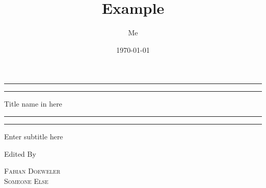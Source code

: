 \documentclass[12pt]{article}
\title{Example}
\author{Me}
\date{\today}
\begin{document}
 

\begin{titlepage} %

	\centering %
	
	\scshape %
	
	\vspace*{\baselineskip} %
	
	
	\rule{\textwidth}{1.6pt}\vspace*{-\baselineskip}\vspace*{2pt} %
	\rule{\textwidth}{0.4pt} %
	
	\vspace{0.75\baselineskip} %
	
	{\LARGE Title name in here} %
	
	\vspace{0.75\baselineskip} %
	
	\rule{\textwidth}{0.4pt}\vspace*{-\baselineskip}\vspace{3.2pt} %
	\rule{\textwidth}{1.6pt} %
	
	\vspace{2\baselineskip} %
	
	
	Enter subtitle here
	
	\vspace*{3\baselineskip} %
	
	
	Edited By
	
	\vspace{0.5\baselineskip} %
	
	{\scshape\Large Fabian Doeweler \\ Someone Else \\} %
	
	\vspace{0.5\baselineskip} %
	

\end{titlepage}
\end{document}
